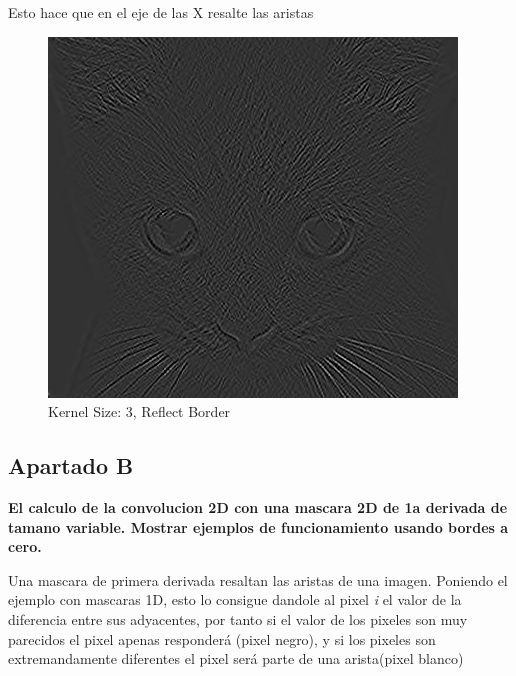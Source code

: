 \documentclass{article}
\begin{document}
Esto hace que en el eje de las X resalte las aristas 
\begin{minipage}{\linewidth}
    \centering
    \begin{minipage}{0.45\linewidth}
        \begin{figure}[H]
			\includegraphics[width=\linewidth]{Ejercicio2a/cat(3,3)_REFLECT.png}             
			\caption{Kernel Size: 3,  Reflect Border}
        \end{figure}
    \end{minipage}   
\end{minipage}

\subsection*{Apartado B}
\textbf{El calculo de la convolucion 2D con una mascara 2D de 1a derivada de tamano variable. Mostrar ejemplos de funcionamiento usando bordes a cero.}

Una mascara de primera derivada resaltan las aristas de una imagen. Poniendo el ejemplo con mascaras 1D, esto lo consigue dandole al pixel \textit{i} el valor de la diferencia entre sus adyacentes, por tanto si el valor de los pixeles son muy parecidos el pixel apenas responderá (pixel negro), y si los pixeles son extremandamente diferentes el pixel será parte de una arista(pixel blanco)
\end{document}
